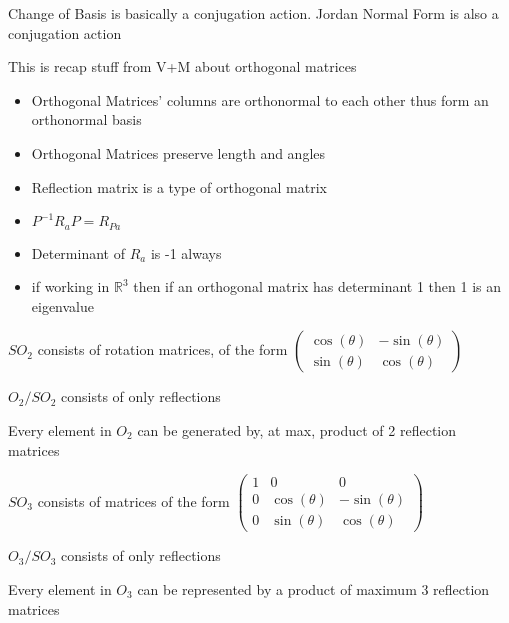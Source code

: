 \documentclass[11pt]{scrartcl}
\begin{document}
\begin{prop}
Change of Basis is basically a conjugation action. Jordan Normal Form is also a conjugation action
\end{prop}
\begin{prop}
This is recap stuff from V+M about orthogonal matrices 
\begin{itemize}
    \item Orthogonal Matrices' columns are orthonormal to each other thus form an orthonormal basis 
    \item Orthogonal Matrices preserve length and angles
    \item Reflection matrix is a type of orthogonal matrix
    \item $P^{-1}R_aP = R_{Pa}$
    \item Determinant of $R_a$ is -1 always
    \item if working in $\mathbb{R}^{3}$ then if an orthogonal matrix has determinant 1 then 1 is an eigenvalue
\end{itemize}
\end{prop}
\begin{prop}
$SO_2$ consists of rotation matrices, of the form $\begin{pmatrix}
  \cos(\theta) & -\sin(\theta)\\ 
  \sin(\theta) & \cos(\theta)
\end{pmatrix}$
\end{prop}
\begin{prop}
$O_2 / SO_2$ consists of only reflections
\end{prop}
\begin{prop}
Every element in $O_2$ can be generated by, at max, product of 2 reflection matrices
\end{prop}
\begin{prop}
$SO_3$ consists of matrices of the form $\begin{pmatrix}
 1 & 0 & 0\\
 0 & \cos(\theta) & -\sin(\theta)\\ 
 0 & \sin(\theta) & \cos(\theta)
\end{pmatrix}$
\end{prop}
\begin{prop}
$O_3/SO_3$ consists of only reflections
\end{prop}
\begin{prop}
Every element in $O_3$ can be represented by a product of maximum 3 reflection matrices
\end{prop}
\end{document}
